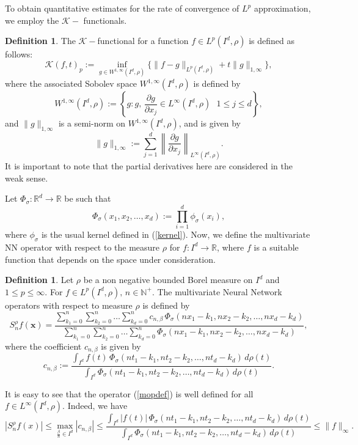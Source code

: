 \documentclass[12pt, reqno]{amsart}
\numberwithin{equation}{section}
\theoremstyle{definition}
\newtheorem{definition}[theorem]{Definition}
\theoremstyle{remark}
\numberwithin{equation}{section}
\newcommand{\R}{\mathbb{R}}
\newcommand{\N}{\mathbb{N}}
\newcommand{\X}{\mathbf{x}}
\newcommand{\LP}{L^p(I^d, \rho)}
\begin{document}
To obtain quantitative estimates for the rate of convergence of $L^p$ approximation, we employ the $\mathcal{K-}$ functionals.   
\begin{definition}  The $\mathcal{K}-$functional for a function $f\in \LP$ is defined as follows:
$$\mathcal{K}(f,t)_p:=\inf_{g\in W^{1, \infty}(I^d,\rho)}\{\|f-g\|_{\LP}+t\|g\|_{1,\infty}\},$$  
where the associated Sobolev space $W^{1,\infty}(I^d, \rho)$ is defined by $$W^{1,\infty}(I^d, \rho):=\left\{g: g,\,\frac{\partial g}{\partial x_j}\in L^{\infty}(I^d,\rho)\, \,  \,\, 1\leq j\leq d\right\},$$ and $\|g\|_{1,\infty}$ is a semi-norm on $W^{1,\infty}(I^d,\rho)$, and is given by 
$$\|g\|_{1,\infty}:= \sum_{j=1}^d \left\|\frac{\partial g}{\partial x_j}\right\|_{L^\infty(I^d,\rho)}.$$ It is important to note that the partial derivatives here are considered in the weak sense. 
\end{definition}

Let $\Phi_\sigma:\R^d\to\R$ be such that $$\Phi_\sigma(x_1, x_2,\ldots,x_d):=\prod_{i=1}^d\phi_\sigma(x_i),$$ where $\phi_\sigma$ is the usual kernel defined in (\ref{kernel}). Now, we define the multivariate NN operator with respect to the measure $\rho$ for $f:I^d\to\R$, where $f$ is a suitable function that depends on the space under consideration.
\begin{definition}
Let $\rho$ be a non negative bounded Borel measure on $I^d$ and $1\leq p \leq \infty$. For $f\in \LP,\, n\in \N^+.$ The multivariate Neural Network operators with respect to measure $\rho$ is defined by \begin{equation}
 S^{\rho}_nf(\X)=\displaystyle{\dfrac{\sum_{k_1=0}^n\sum_{k_2=0}^n\ldots\sum_{k_d=0}^nc_{n,\beta}\,\Phi_\sigma(nx_1-k_1,nx_2-k_2,\ldots,nx_d-k_d)}{\sum_{k_1=0}^n\sum_{k_2=0}^n\ldots\sum_{k_d=0}^n\Phi_\sigma(nx_1-k_1,nx_2-k_2,\ldots,nx_d-k_d)}}, \label{mopdef} \end{equation} where the coefficient $c_{n,\beta}$ is given by 
$$c_{n,\beta}:=\dfrac{\int_{I^d}f(t)\,\Phi_\sigma(nt_1-k_1,nt_2-k_2,\ldots,nt_d-k_d)\,d\rho(t)}{\int_{I^d}\Phi_\sigma(nt_1-k_1,nt_2-k_2,\ldots,nt_d-k_d)\,d\rho(t)}.$$ \end{definition}

It is easy to see that the operator (\ref{mopdef}) is well defined for all $f\in L^{\infty}(I^d,\rho).$ Indeed, we have
\begin{equation*}
    |S^{\rho}_nf(x)|\leq \max_{\frac{\beta}{n} \in I^d}|c_{n,\beta}| \leq \dfrac{\int_{I^d}|f(t)|\,\Phi_\sigma(nt_1-k_1,nt_2-k_2,\ldots,nt_d-k_d)\,d\rho(t)}{\int_{I^d}\Phi_\sigma(nt_1-k_1,nt_2-k_2,\ldots,nt_d-k_d)\,d\rho(t)}
    \leq \|f\|_{\infty}.
    \end{equation*}
\end{document}
